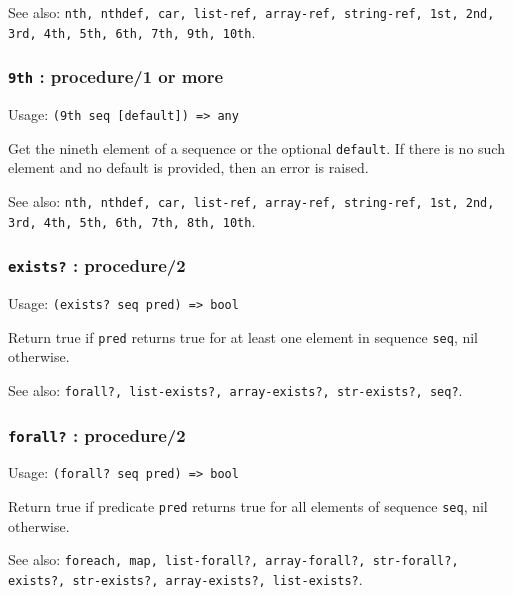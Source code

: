 \documentclass[
]{article}
\newcommand{\passthrough}[1]{#1}
\begin{document}
See also:
\passthrough{\lstinline!nth, nthdef, car, list-ref, array-ref, string-ref, 1st, 2nd, 3rd, 4th, 5th, 6th, 7th, 9th, 10th!}.

\hypertarget{th-procedure1-or-more-6}{%
\subsubsection{\texorpdfstring{\texttt{9th} : procedure/1 or
more}{9th : procedure/1 or more}}\label{th-procedure1-or-more-6}}

Usage: \passthrough{\lstinline!(9th seq [default]) => any!}

Get the nineth element of a sequence or the optional
\passthrough{\lstinline!default!}. If there is no such element and no
default is provided, then an error is raised.

See also:
\passthrough{\lstinline!nth, nthdef, car, list-ref, array-ref, string-ref, 1st, 2nd, 3rd, 4th, 5th, 6th, 7th, 8th, 10th!}.

\hypertarget{exists-procedure2}{%
\subsubsection{\texorpdfstring{\texttt{exists?} :
procedure/2}{exists? : procedure/2}}\label{exists-procedure2}}

Usage: \passthrough{\lstinline!(exists? seq pred) => bool!}

Return true if \passthrough{\lstinline!pred!} returns true for at least
one element in sequence \passthrough{\lstinline!seq!}, nil otherwise.

See also:
\passthrough{\lstinline!forall?, list-exists?, array-exists?, str-exists?, seq?!}.

\hypertarget{forall-procedure2}{%
\subsubsection{\texorpdfstring{\texttt{forall?} :
procedure/2}{forall? : procedure/2}}\label{forall-procedure2}}

Usage: \passthrough{\lstinline!(forall? seq pred) => bool!}

Return true if predicate \passthrough{\lstinline!pred!} returns true for
all elements of sequence \passthrough{\lstinline!seq!}, nil otherwise.

See also:
\passthrough{\lstinline!foreach, map, list-forall?, array-forall?, str-forall?, exists?, str-exists?, array-exists?, list-exists?!}.
\end{document}
